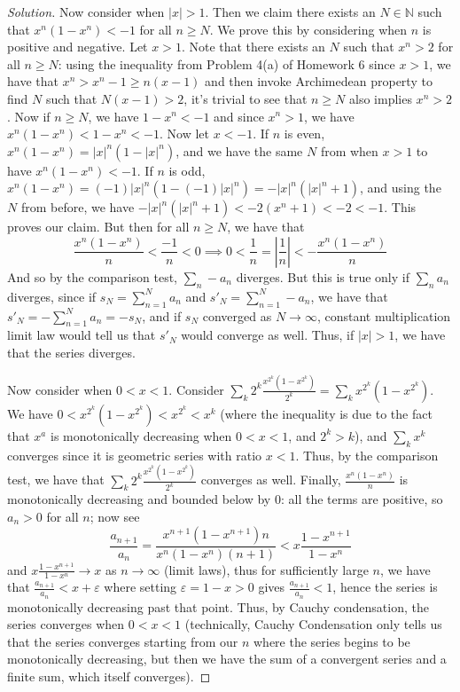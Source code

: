 \documentclass{article}
\newcommand{\N}{{\mathbb N}}
\newcommand{\ep}{{\varepsilon}}
\begin{document}
\begin{enumerate}
\begin{proof}[Solution]
		Now consider when $|x| > 1$.
		Then we claim there exists an $N\in \N$ such that $x^n(1-x^n) < -1$
		for all $n \geq N$.
		We prove this by considering when $n$ is positive and negative.
		Let $x > 1$.
		Note that there exists an $N$ such that $x^n > 2$
		for all $n \geq N$:
		using the inequality from Problem 4(a) of Homework 6 since $x > 1$,
		we have that $x^n > x^n - 1 \geq n(x-1)$
		and then invoke Archimedean property to find $N$ such that $N(x-1) > 2$,
		it's trivial to see that $n \geq N$ also implies $x^n > 2$.
		Now if $n \geq N$, we have $1-x^n < -1$ and since
		$x^n > 1$, we have $x^n(1-x^n) < 1-x^n < -1$.
		Now let $x < -1$.
		If $n$ is even, $x^n(1-x^n) = |x|^n(1-|x|^n)$,
		and we have the same $N$ from when $x > 1$
		to have $x^n(1-x^n) < -1$.
		If $n$ is odd, $x^n(1-x^n) = (-1)|x|^n(1-(-1)|x|^n) = -|x|^n(|x|^n + 1)$,
		and using the $N$ from before, we have $-|x|^n (|x|^n+1) < -2(x^n+1) < -2 < -1$.
		This proves our claim.
		But then for all $n \geq N$,
		we have that
		\[
			\frac{x^n(1-x^n)}{n} < \frac{-1}{n} < 0 \implies
			0 < \frac{1}{n} = \left\lvert \frac{1}{n} \right\rvert < -\frac{x^n(1-x^n)}{n}
		\]
		And so by the comparison test,
		$\sum_n -a_n$ diverges.
		But this is true only if $\sum_n a_n$ diverges,
		since if $s_N = \sum_{n=1}^N a_n$ and $s'_N = \sum_{n=1}^N -a_n$,
		we have that $s'_N = -\sum_{n=1}^N a_n = -s_N$,
		and if $s_N$ converged as $N \to \infty$,
		constant multiplication limit law would tell us that $s'_N$
		would converge as well.
		Thus, if $|x| > 1$, we have that the series diverges.

		Now consider when $0 < x < 1$.
		Consider $\sum_k 2^k\frac{x^{2^k}(1-x^{2^k})}{2^k} = \sum_k x^{2^k}(1-x^{2^k})$.
		We have $0 < x^{2^k}(1-x^{2^k}) < x^{2^k} < x^k$
		(where the inequality is due to the fact that
		$x^a$ is monotonically decreasing when $0 < x < 1$,
		and $2^k > k$),
		and $\sum_k x^k$ converges since it is geometric series
		with ratio $x < 1$.
		Thus, by the comparison test,
		we have that $\sum_k 2^k\frac{x^{2^k}(1-x^{2^k})}{2^k}$
		converges as well.
		Finally, $\frac{x^n(1-x^n)}{n}$ is monotonically
		decreasing and bounded below by $0$:
		all the terms are positive, so $a_n > 0$ for all $n$;
		now see
		\[
			\frac{a_{n+1}}{a_n}
			= \frac{x^{n+1}(1-x^{n+1})n}{x^n(1-x^n)(n+1)}
			< x\frac{1-x^{n+1}}{1-x^n}{}
		\]
		and $x\frac{1-x^{n+1}}{1-x^n} \to x$ as $n \to \infty$
		(limit laws),
		thus for sufficiently large $n$,
		we have that $\frac{a_{n+1}}{a_n} < x + \ep$
		where setting $\ep = 1 - x > 0$ gives $\frac{a_{n+1}}{a_n} < 1$,
		hence the series is monotonically decreasing past that point.
		Thus, by Cauchy condensation, the series converges
		when $0 < x < 1$
		(technically, Cauchy Condensation only tells us that
		the series converges starting from our $n$
		where the series begins to be monotonically decreasing,
		but then we have the sum of a convergent series
		and a finite sum, which itself converges).


\end{proof}
\end{enumerate}
\end{document}
